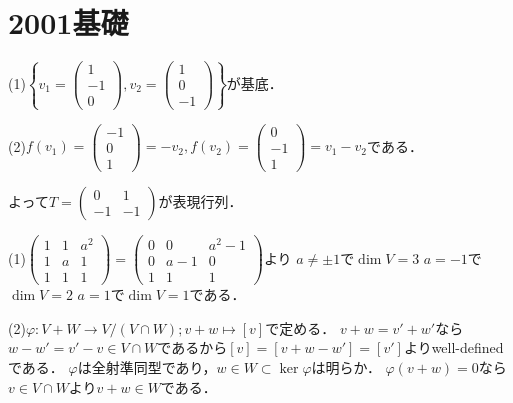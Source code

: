 \documentclass[
		book,
		head_space=20mm,
		foot_space=20mm,
		gutter=10mm,
		line_length=190mm
]{jlreq}
\begin{document}
\section{2001基礎}
(1)$\left\{v_1= \begin{pmatrix}
1\\-1\\0
\end{pmatrix},v_2=\begin{pmatrix}
1\\0\\-1
\end{pmatrix} \right\}$が基底．

(2)$f(v_1)=\begin{pmatrix}
	-1 \\0\\ 1
	\end{pmatrix}=-v_2,f(v_2)=\begin{pmatrix}
	0\\-1\\1
	\end{pmatrix}=v_1-v_2$である．

	よって$T=\begin{pmatrix}
	0 & 1\\
	-1 &- 1
	\end{pmatrix}$が表現行列．

(1)$\begin{pmatrix}
	1 & 1 & a^2\\
	1 & a & 1 \\
	1 & 1 & 1
\end{pmatrix}=\begin{pmatrix}
	0 & 0 & a^2-1\\
	0 & a-1 & 0 \\
	1 & 1 & 1
\end{pmatrix}$より
$a\neq \pm1$で$\dim V=3$
$a=-1$で$\dim V=2$
$a=1$で$\dim V=1$である．

(2)$\varphi\colon V+W\rightarrow V/(V\cap W);v+w\mapsto[v]$で定める．
$v+w=v'+w'$なら$w-w'=v'-v\in V\cap W$であるから$[v]=[v+w-w']=[v']$よりwell-definedである．
$\varphi$は全射準同型であり，$w\in W\subset \ker \varphi$は明らか．
$\varphi(v+w)=0$なら$v\in V\cap W$より$v+w\in W$である．
\end{document}
